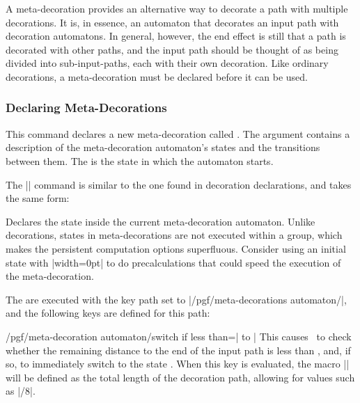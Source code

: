 \label{section-base-meta-decorations}

A meta-decoration provides an alternative way to decorate a path with
multiple decorations. It is, in essence, an automaton that decorates
an input path with decoration automatons. In general, however, the end
effect is still that a path is decorated with other paths, and the input
path should be thought of as being divided into sub-input-paths, each with
their own decoration. Like ordinary decorations, a meta-decoration must be declared before it can be used.

\subsubsection{Declaring Meta-Decorations}

\begin{command}{\pgfdeclaremetadecorate{}}

  This command declares a new meta-decoration called . The
   argument contains a description of the meta-decoration
  automaton's states and the transitions between them. The
   is the state in which the automaton starts.

  The |\state| command is similar to the one found in
  decoration declarations, and takes the same form:

  \begin{command}{\state{}}
    Declares the state  inside the current meta-decoration
    automaton. Unlike decorations, states in meta-decorations are not
    executed within a group, which makes the persistent computation
    options superfluous. Consider using an initial state with
    |width=0pt| to do precalculations that could speed the execution
    of the meta-decoration.

    The  are executed with the key path set to
    |/pgf/meta-decorations automaton/|, and the following keys are defined for
    this path:

    \begin{key}{/pgf/meta-decoration automaton/switch if less than=| to |}
      This causes \pgfname\ to check whether the
      remaining distance to the end of the input path is less than
      , and, if so, to immediately switch to the state
      . When this key is evaluated, the macro
      |\pgfmetadecoratedpathlength| will be defined as the total length of
      the decoration path, allowing for values such as
      |\pgfmetadecoratedpathlength/8|.
    \end{key}


\end{command}
\end{command}
